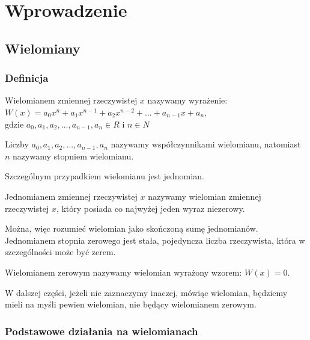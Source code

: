 \chapter{Wprowadzenie}

\section{Wielomiany}

\subsection{Definicja}

\begin{definition}
	$ $\\
	Wielomianem zmiennej rzeczywistej $x$ nazywamy wyrażenie: \\
	$W(x) = a_0x^n + a_1x^{n-1} + a_2x^{n-2}+ ... + a_{n-1}x + a_n$, \\
	gdzie $a_0, a_1, a_2, ..., a_{n-1}, a_n\in R$ i $n \in N$
\end{definition}

Liczby $a_0, a_1, a_2, ..., a_{n-1}, a_n$ nazywamy współczynnikami wielomianu, natomiast $n$ nazywamy stopniem wielomianu.

Szczególnym przypadkiem wielomianu jest jednomian. 

\begin{definition}
	$ $\\
	Jednomianem zmiennej rzeczywistej $x$ nazywamy wielomian zmiennej rzeczywistej $x$, który posiada co najwyżej jeden wyraz niezerowy.
\end{definition}

Można, więc rozumieć wielomian jako skończoną sumę jednomianów.
Jednomianem stopnia zerowego jest stała, pojedyncza liczba rzeczywista, która w szczególności może być zerem.

\begin{definition}
	$ $\\
	Wielomianem zerowym nazywamy wielomian wyrażony wzorem:	$W(x) = 0$.
\end{definition}

W dalszej części, jeżeli nie zaznaczymy inaczej, mówiąc wielomian, będziemy mieli na myśli pewien wielomian, nie będący wielomianem zerowym.

\subsection{Podstawowe działania na wielomianach}

